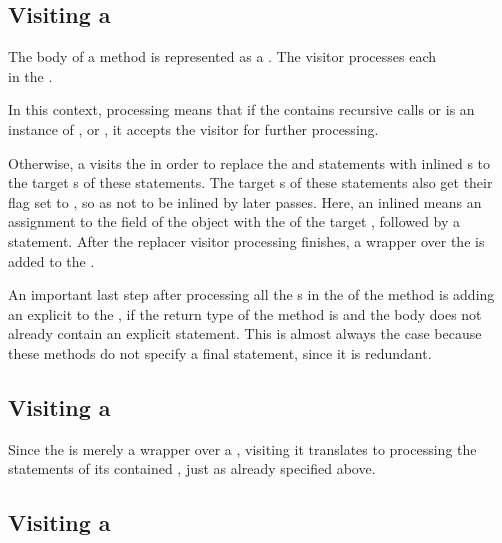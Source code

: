 \subsection{Visiting a }

The body of a method is represented as a . The visitor processes each\\
 in the .

In this context, processing means that if the  contains recursive calls or is an instance of
,  or ,
it accepts the visitor for further processing.

Otherwise, a  visits the  in order to replace the  and
 statements with inlined s to the target s of these
statements. The target s of these statements also get their  flag set to ,
so as not to be inlined by later passes. Here, an inlined  means an assignment to the
 field of the  object with the  of the target , followed by a 
statement. After the replacer visitor processing finishes, a  wrapper over the
 is added to the .

An important last step after processing all the s in the  of the method is adding
an explicit  to the , if the return type of the method is  and the
body does not already contain an explicit  statement. This is almost always the case because these methods
do not specify a final  statement, since it is redundant.

\subsection{Visiting a }
Since the  is merely a wrapper over a , visiting it translates to processing
the statements of its contained , just as already specified above.

\subsection{Visiting a }

